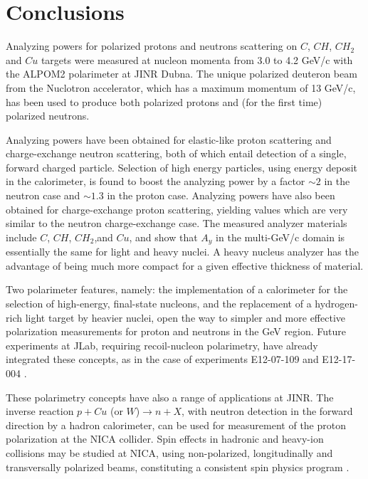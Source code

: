 \documentclass[epj]{svjour}
\begin{document}


\section{Conclusions}
Analyzing powers for polarized  protons and neutrons scattering on $C$, $CH$, $CH_2$ and $Cu$ targets were measured at nucleon momenta from 3.0 to 4.2 GeV/c with the ALPOM2 polarimeter at JINR Dubna. The unique polarized deuteron beam from the Nuclotron accelerator, which has a maximum momentum of 13 GeV/c, has been used to produce both polarized protons and (for the first time) polarized neutrons.

Analyzing powers have been obtained for elastic-like proton scattering and charge-exchange neutron scattering, both of which entail detection of a single, forward charged particle. Selection of high energy particles, using energy deposit in the calorimeter, is found to boost the analyzing power by a factor $\sim 2$ in the neutron case and $\sim 1.3$ in the proton case.
Analyzing powers have also been obtained for charge-exchange proton scattering, yielding values which are very similar to the neutron charge-exchange case.
The measured analyzer materials include $C$, $CH$, $CH_2$,and $Cu$, and show that $A_y$ in the multi-GeV/c domain is essentially the same for light and heavy nuclei. A heavy nucleus analyzer has the advantage of being much more compact for a given effective thickness of material.

Two polarimeter features, namely: the implementation of a calorimeter for the selection of high-energy, final-state nucleons,
and the replacement of a hydrogen-rich light target by heavier nuclei, open the way to simpler and more effective polarization measurements  for proton and neutrons in the GeV region.
Future experiments at JLab, requiring recoil-nucleon polarimetry, have already integrated these concepts, as in the case of experiments E12-07-109 \cite{PR12-07-109} and E12-17-004 \cite{PR12-17-004}.

These polarimetry concepts have also a range of applications at JINR. The inverse reaction $p+Cu$ (or $W$)$\to n+X$, with neutron detection in the forward direction by a hadron calorimeter, can be used for measurement of the proton polarization at the NICA collider. Spin effects in hadronic and heavy-ion collisions may be studied at NICA, using non-polarized, longitudinally and transversally polarized beams, constituting a consistent spin physics program \cite{Savin:2016arw}.
\end{document}
